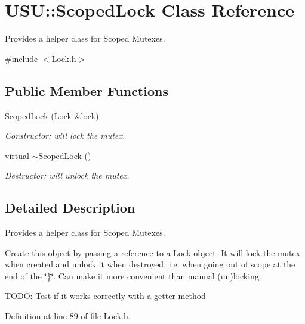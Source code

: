 \hypertarget{class_u_s_u_1_1_scoped_lock}{\section{\-U\-S\-U\-:\-:\-Scoped\-Lock \-Class \-Reference}
\label{class_u_s_u_1_1_scoped_lock}
}


\-Provides a helper class for \-Scoped \-Mutexes.  




{\ttfamily \#include $<$\-Lock.\-h$>$}

\subsection*{\-Public \-Member \-Functions}
\begin{DoxyCompactItemize}
\item 
\hyperlink{class_u_s_u_1_1_scoped_lock_aa92db605fefa48f75be29b86ad0d6186}{\-Scoped\-Lock} (\hyperlink{class_u_s_u_1_1_lock}{\-Lock} \&lock)
\begin{DoxyCompactList}\small\item\em \-Constructor\-: will lock the mutex. \end{DoxyCompactList}\item 
virtual \hyperlink{class_u_s_u_1_1_scoped_lock_a5cf581cbe18004e6fec30724c5f94071}{$\sim$\-Scoped\-Lock} ()
\begin{DoxyCompactList}\small\item\em \-Destructor\-: will unlock the mutex. \end{DoxyCompactList}\end{DoxyCompactItemize}


\subsection{\-Detailed \-Description}
\-Provides a helper class for \-Scoped \-Mutexes. 

\-Create this object by passing a reference to a \hyperlink{class_u_s_u_1_1_lock}{\-Lock} object. \-It will lock the mutex when created and unlock it when destroyed, i.\-e. when going out of scope at the end of the \char`\"{}\}\char`\"{}. \-Can make it more convenient than manual (un)locking.

\-T\-O\-D\-O\-: \-Test if it works correctly with a getter-\/method 

\-Definition at line 89 of file \-Lock.\-h.



